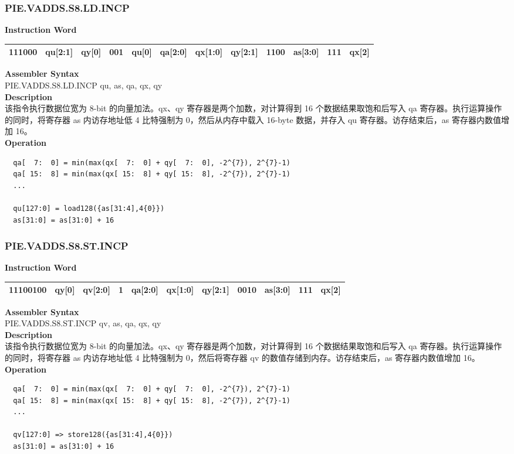 \newpage
\subsubsection{PIE.VADDS.S8.LD.INCP}\label{instruction:PIEVADDSS8LDINCP}
\setlength\tabcolsep{6pt}
\textbf{Instruction Word} \\
\begin{tabular}{|c|c|c|c|c|c|c|c|c|c|c|c|}
	\hline
	111000 & qu[2:1] & qy[0] & 001 & qu[0] & qa[2:0] & qx[1:0] & qy[2:1] & 1100 & as[3:0] & 111 & qx[2] \\
	\hline
\end{tabular}

\textbf{Assembler Syntax} \\
PIE.VADDS.S8.LD.INCP qu, as, qa, qx, qy \\
\textbf{Description} \\
该指令执行数据位宽为 8-bit 的向量加法。qx、qy 寄存器是两个加数，对计算得到 16 个数据结果取饱和后写入 qa 寄存器。执行运算操作的同时，将寄存器 as 内访存地址低 4 比特强制为 0，然后从内存中载入 16-byte 数据，并存入 qu 寄存器。访存结束后，as 寄存器内数值增加 16。\\
\textbf{Operation}
\begin{lstlisting}
  qa[  7:  0] = min(max(qx[  7:  0] + qy[  7:  0], -2^{7}), 2^{7}-1)
  qa[ 15:  8] = min(max(qx[ 15:  8] + qy[ 15:  8], -2^{7}), 2^{7}-1)
  ...

  qu[127:0] = load128({as[31:4],4{0}})
  as[31:0] = as[31:0] + 16
\end{lstlisting}

\newpage
\subsubsection{PIE.VADDS.S8.ST.INCP}\label{instruction:PIEVADDSS8STINCP}
\setlength\tabcolsep{6pt}
\textbf{Instruction Word} \\
\begin{tabular}{|c|c|c|c|c|c|c|c|c|c|c|}
	\hline
	11100100 & qy[0] & qv[2:0] & 1 & qa[2:0] & qx[1:0] & qy[2:1] & 0010 & as[3:0] & 111 & qx[2] \\
	\hline
\end{tabular}

\textbf{Assembler Syntax} \\
PIE.VADDS.S8.ST.INCP qv, as, qa, qx, qy \\
\textbf{Description} \\
该指令执行数据位宽为 8-bit 的向量加法。qx、qy 寄存器是两个加数，对计算得到 16 个数据结果取饱和后写入 qa 寄存器。执行运算操作的同时，将寄存器 as 内访存地址低 4 比特强制为 0，然后将寄存器 qv 的数值存储到内存。访存结束后，as 寄存器内数值增加 16。\\
\textbf{Operation}
\begin{lstlisting}
  qa[  7:  0] = min(max(qx[  7:  0] + qy[  7:  0], -2^{7}), 2^{7}-1)
  qa[ 15:  8] = min(max(qx[ 15:  8] + qy[ 15:  8], -2^{7}), 2^{7}-1)
  ...

  qv[127:0] => store128({as[31:4],4{0}})
  as[31:0] = as[31:0] + 16
\end{lstlisting}

